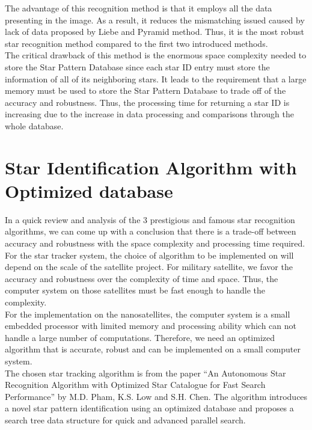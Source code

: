 \noindent The advantage of this recognition method is that it employs all the data presenting in the image. As a result, it reduces the mismatching issued caused by lack of data proposed by Liebe and Pyramid method. Thus, it is the most robust star recognition method compared to the first two introduced methods. \\

\noindent The critical drawback of this method is the enormous space complexity needed to store the Star Pattern Database since each star ID entry must store the information of all of its neighboring stars. It leads to the requirement that a large memory must be used to store the Star Pattern Database to trade off of the accuracy and robustness. Thus, the processing time for returning a star ID is increasing due to the increase in data processing and comparisons through the whole database.

\section{Star Identification Algorithm with Optimized database}

In a quick review and analysis of the 3 prestigious and famous star recognition algorithms, we can come up with a conclusion that there is a trade-off between accuracy and robustness with the space complexity and processing time required. For the star tracker system, the choice of algorithm to be implemented on will depend on the scale of the satellite project. For military satellite, we favor the accuracy and robustness over the complexity of time and space. Thus, the computer system on those satellites must be fast enough to handle the complexity. \\

\noindent For the implementation on the nanosatellites, the computer system is a small embedded processor with limited memory and processing ability which can not handle a large number of computations. Therefore, we need an optimized algorithm that is accurate, robust and can be implemented on a small computer system. \\

\noindent The chosen star tracking algorithm is from the paper “An Autonomous Star Recognition Algorithm with Optimized Star Catalogue for Fast Search Performance” by M.D. Pham, K.S. Low and S.H. Chen\cite{edselc.2-52.0-8487677997120120101,edseee.655799920130101}. The algorithm introduces a novel star pattern identification using an optimized database and proposes a search tree data structure for quick and advanced parallel search. \\


